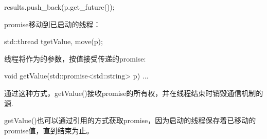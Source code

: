 \begin{cppcode}
results.push_back(p.get_future());
\end{cppcode}

promise移动到已启动的线程：

\begin{cppcode}
std::thread t{getValue, move(p)};
\end{cppcode}

线程将作为的参数，按值接受传递的promise:

\begin{cppcode}
void getValue(std::promise<std::string> p)
{
	...
}
\end{cppcode}

通过这种方式，getValue()接收promise的所有权，并在线程结束时销毁通信机制的源.

getValue()也可以通过引用的方式获取promise，因为启动的线程保存着已移动的promise值，直到结束为止。














